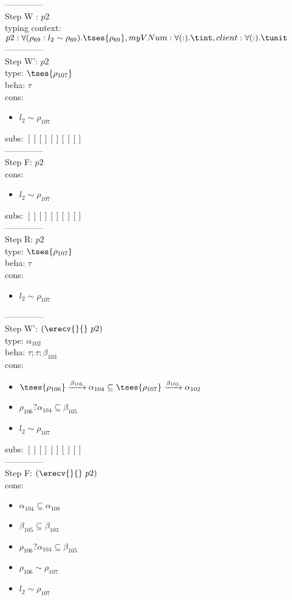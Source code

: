 \documentclass[12pt]{article}
\begin{document}
  --------------\\ 
Step W : $ p2 $\\
 typing context: $ p2:\forall (\rho_{69} : l_{2} \sim\rho_{69}).  \tses{ \rho_{69}}, myVNum:\forall ( : ). \tint, client:\forall ( : ). \tunit$ 
\\ --------------\\
Step W': $ p2 $\\
  type: $  \tses{ \rho_{107}} $ 
\\  beha: $ \tau $ 
\\  cons: \begin{itemize}
\item $ l_{2} \sim\rho_{107} $
\end{itemize} 
  subs:  $ [ ] [] [] [] [] $  
 \\--------------\\ 
Step F: $ p2 $
 \\ cons: \begin{itemize}
\item $ l_{2} \sim\rho_{107} $
\end{itemize}
 subs:  $ [ ] [] [] [] [] $ 
  \\--------------\\ 
Step R: $ p2 $\\
  type: $  \tses{ \rho_{107}} $ 
\\  beha: $ \tau $ 
\\  cons: \begin{itemize}
\item $ l_{2} \sim\rho_{107} $
\end{itemize} 
  --------------\\ 
Step W': $ (\erecv{}{}~p2) $\\
  type: $ \alpha_{102} $ 
\\  beha: $ \tau; \tau; \beta_{103} $ 
\\  cons: \begin{itemize}
\item $  \tses{ \rho_{106}} \xrightarrow{\beta_{105}} \alpha_{104} \subseteq  \tses{ \rho_{107}} \xrightarrow{\beta_{103}} \alpha_{102} $
\item $ \rho_{106}?\alpha_{104} \subseteq \beta_{105} $
\item $ l_{2} \sim\rho_{107} $
\end{itemize} 
  subs:  $ [ ] [] [] [] [] $  
 \\--------------\\ 
Step F: $ (\erecv{}{}~p2) $
 \\ cons: \begin{itemize}
\item $ \alpha_{104} \subseteq \alpha_{108} $
\item $ \beta_{105} \subseteq \beta_{103} $
\item $ \rho_{106}?\alpha_{104} \subseteq \beta_{105} $
\item $ \rho_{106} \sim\rho_{107} $
\item $ l_{2} \sim\rho_{107} $
\end{itemize}
\end{document}
